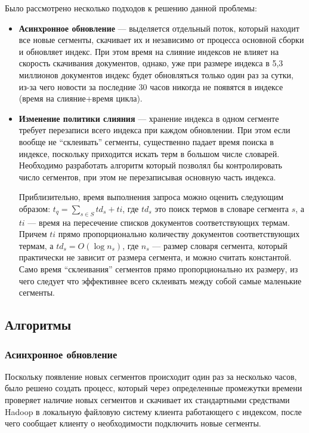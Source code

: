 Было рассмотрено несколько подходов к решению данной проблемы:
\begin{itemize}
 \item \textbf{Асинхронное обновление} --- выделяется отдельный поток, который  находит все новые сегменты, скачивает их и независимо от процесса основной сборки и обновляет индекс. При этом время на слияние индексов не влияет на скорость скачивания документов, однако, уже при размере индекса в 5,3 миллионов документов индекс будет обновляться только один раз за сутки, из-за чего новости за последние 30 часов никогда не появятся в индексе (время на слияние+время цикла).
 \item \textbf{Изменение политики слияния} --- хранение индекса в одном сегменте требует перезаписи всего индекса при каждом обновлении. При этом если вообще не ``склеивать'' сегменты, существенно падает время поиска в индексе, поскольку приходится искать терм в большом числе словарей. Необходимо разработать алгоритм который позволял бы контролировать число сегментов, при этом не перезаписывая основную часть индекса.

Приблизительно, время выполнения запроса можно оценить следующим образом: $t_{q} = \sum\limits_{s\in S} td_{s} + ti$, где $td_{s}$ это поиск термов в словаре сегмента $s$, а $ti$ --- время на пересечение списков документов соответствующих термам. Причем $ti$ прямо пропорционально количеству документов соответствующих термам, а $td_{s} = O(\log n_{s})$, где $n_{s}$ --- размер словаря сегмента, который практически не зависит от размера сегмента, и можно считать константой. Само время ``склеивания'' сегментов прямо пропорционально их размеру, из чего следует что эффективнее всего склеивать между собой самые маленькие сегменты. 
 
\end{itemize}
\subsection{Алгоритмы}
\subsubsection{Асинхронное обновление}
Поскольку появление новых сегментов происходит один раз за несколько часов, было решено создать процесс, который через определенные промежутки времени проверяет наличие новых сегментов и скачивает их стандартными средствами Hadoop в локальную файловую систему клиента работающего с индексом, после чего сообщает клиенту о необходимости подключить новые сегменты.
